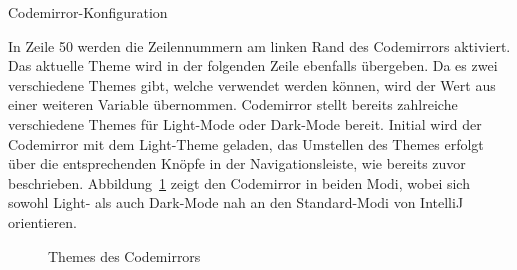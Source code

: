 \begin{listing}[!ht]
    \inputminted[firstnumber=49]{ts}{listings/3.2/codemirror-options.ts}
    \caption{Codemirror-Konfiguration}
    \label{listing:configuration}
\end{listing}

In Zeile 50 werden die Zeilennummern am linken Rand des Codemirrors aktiviert.
Das aktuelle Theme wird in der folgenden Zeile ebenfalls übergeben.
Da es zwei verschiedene Themes gibt, welche verwendet werden können, wird der Wert aus einer weiteren Variable übernommen.
Codemirror stellt bereits zahlreiche verschiedene Themes für Light-Mode oder Dark-Mode bereit.
Initial wird der Codemirror mit dem Light-Theme geladen, das Umstellen des Themes erfolgt über die entsprechenden Knöpfe in der Navigationsleiste, wie bereits zuvor beschrieben.
Abbildung~\ref{fig:themes} zeigt den Codemirror in beiden Modi, wobei sich sowohl Light- als auch Dark-Mode nah an den Standard-Modi von IntelliJ orientieren.

\begin{figure}%
    \centering
    \qquad
    \caption{Themes des Codemirrors}%
    \label{fig:themes}%
\end{figure}

